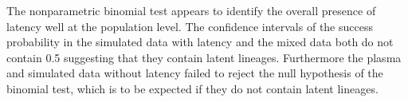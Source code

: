 \documentclass[12pt]{article}
\begin{document}
The nonparametric binomial test appears to identify the overall presence of latency well at the population level.
The confidence intervals of the success probability in the simulated data with latency and the mixed data both do not contain 0.5 suggesting that they contain latent lineages.
Furthermore the plasma and simulated data without latency failed to reject the null hypothesis of the binomial test, which is to be expected if they do not contain latent lineages.





\end{document}
